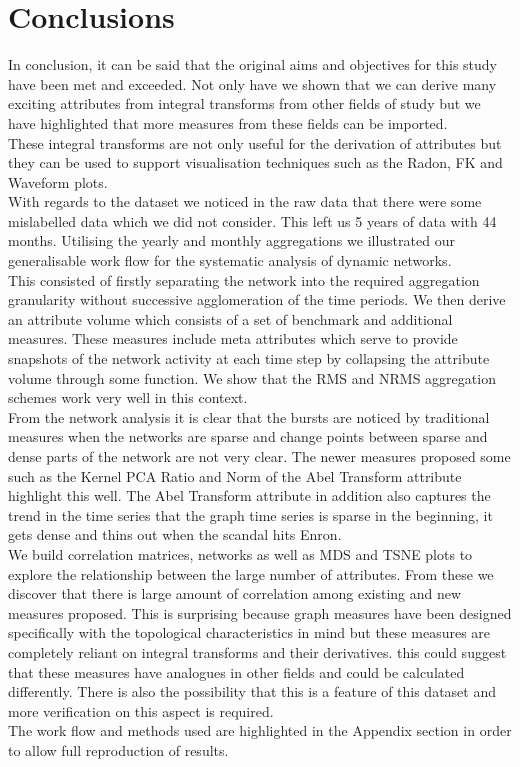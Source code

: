\section{Conclusions}

In conclusion, it can be said that the original aims and objectives for this study have been met and exceeded. Not only have we shown that we can derive many exciting attributes from integral transforms from other fields of study but we have highlighted that more measures from these fields can be imported. \\

These integral transforms are not only useful  for the derivation of attributes but they can be used to support visualisation techniques such as the Radon, FK and Waveform plots. \\

With regards to the dataset we noticed in the raw data that there were some mislabelled data which we did not consider. This left us 5 years of data with 44 months. Utilising the yearly and monthly aggregations we illustrated our generalisable work flow for the systematic analysis of dynamic networks. \\

This consisted of firstly separating the network into the required aggregation granularity without successive agglomeration of the time periods. We then derive an attribute volume which consists of a set of benchmark and additional measures. These measures include meta attributes which serve to provide snapshots of the network activity at each time step by collapsing the attribute volume through some function. We show that the RMS and NRMS aggregation schemes work very well in this context. \\

From the network analysis it is clear that the bursts are noticed by traditional measures when the networks are sparse and change points between sparse and dense parts of the network are not very clear. The newer measures proposed some such as the Kernel PCA Ratio and Norm of the Abel Transform attribute highlight this well. The Abel Transform attribute in addition also captures the trend in the time series that the graph time series is sparse in the beginning, it gets dense and thins out when the scandal hits Enron. \\

We build correlation matrices, networks as well as MDS and TSNE plots to explore the relationship between the large number of attributes. From these we discover that there is large amount of correlation among existing and new measures proposed. This is surprising because graph measures have been designed specifically with the topological characteristics in mind but these measures are completely reliant on integral transforms and their derivatives. this could suggest that these measures have analogues in other fields and could be calculated differently. There is also the possibility that this is a feature of this dataset and more verification on this aspect is required. \\

The work flow and methods used are highlighted in the Appendix section in order to allow full reproduction of results. \\

